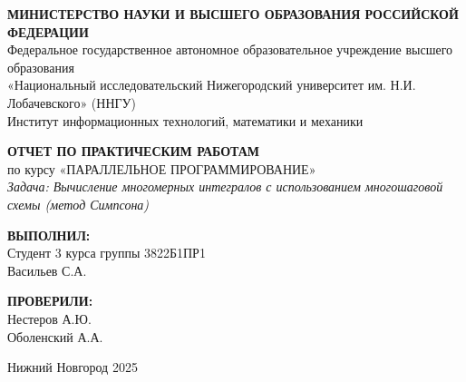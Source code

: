 \documentclass[14pt,a4paper]{extarticle}
\begin{document}
\begin{titlepage}
\begin{center}

\onehalfspacing

\begin{center}
    \textbf{МИНИСТЕРСТВО НАУКИ И ВЫСШЕГО ОБРАЗОВАНИЯ РОССИЙСКОЙ ФЕДЕРАЦИИ} \\
    Федеральное государственное автономное образовательное учреждение высшего образования \\
    «Национальный исследовательский Нижегородский университет им. Н.И. Лобачевского» (ННГУ) \\
    Институт информационных технологий, математики и механики
\end{center}

\vspace{4cm}

\begin{center}
    \textbf{ОТЧЕТ ПО ПРАКТИЧЕСКИМ РАБОТАМ} \vspace{0.5cm}\\
    по курсу «ПАРАЛЛЕЛЬНОЕ ПРОГРАММИРОВАНИЕ» \vspace{0.5cm}\\
    \textit{Задача: Вычисление многомерных интегралов с использованием многошаговой схемы (метод Симпсона)}
\end{center}

\vspace{4cm}

\begin{flushright}
    \textbf{ВЫПОЛНИЛ:} \\ 
    Студент 3 курса 
    группы 3822Б1ПР1 \\ 
    Васильев С.А. \\

    \vspace{1cm}

    \textbf{ПРОВЕРИЛИ:} \\ 
    Нестеров А.Ю. \\ 
    Оболенский А.А.
\end{flushright}

\vspace{1cm}

\begin{center}
    Нижний Новгород 2025\newpage
\end{center}

\end{center}
\end{titlepage}
\end{document}
